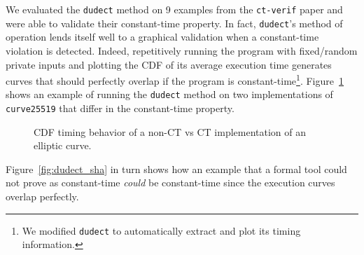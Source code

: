 We evaluated the \texttt{dudect} method on 9 examples from the \texttt{ct-verif} paper and were able to validate their constant-time property.
In fact, \texttt{dudect}'s method of operation lends itself well to a graphical validation when a constant-time violation is detected.
Indeed, repetitively running the program with fixed/random private inputs and plotting the CDF of its average execution time generates curves that should perfectly overlap if the program is constant-time\footnote{We modified \texttt{dudect} to automatically extract and plot its timing information.}.
Figure~\ref{fig:dudect_donna} shows an example of running the \texttt{dudect} method on two implementations of \texttt{curve25519} that differ in the constant-time property.

\begin{figure}[h!]
  \centering
  \label{fig:dudect_donnabad}
  \label{fig:dudect_donnagood}
  \caption{CDF timing behavior of a non-CT vs CT implementation of an elliptic curve.}
  \label{fig:dudect_donna}
\end{figure}

Figure~\ref{fig:dudect_sha} in turn shows how an example that a formal tool could not prove as constant-time \emph{could} be constant-time since the execution curves overlap perfectly.

